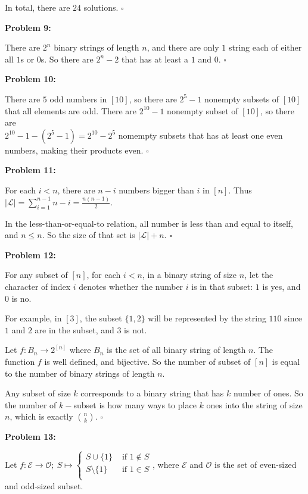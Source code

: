 \documentclass[12pt]{article}
\begin{document}
In total, there are $24$ solutions. $\square$

\textbf{Problem 9:}

There are $2^n$ binary strings of length $n$, and there are only $1$ string each of either all $1$s or $0$s. So there are $2^n-2$ that has at least a $1$ and $0$. $\square$

\textbf{Problem 10:}

There are $5$ odd numbers in $[10]$, so there are $2^5-1$ nonempty subsets of $[10]$ that all elements are odd. There are $2^{10}-1$ nonempty subset of $[10]$, so there are\\ $2^{10}-1-(2^5-1) = 2^{10}-2^5$ nomempty subsets that has at least one even numbers, making their products even. $\square$

\textbf{Problem 11:}

For each $i < n$, there are $n-i$ numbers bigger than $i$ in $[n]$. Thus $|\mathcal{L}| = \sum\limits^{n-1}_{i=1} n-i = \frac{n(n-1)}{2}$.

In the less-than-or-equal-to relation, all number is less than and equal to itself, and $n \le n$. So the size of that set is $|\mathcal{L}| + n$. $\square$

\textbf{Problem 12:}

For any subset of $[n]$, for each $i < n$, in a binary string of size $n$, let the character of index $i$ denotes whether the number $i$ is in that subset: $1$ is yes, and $0$ is no.

For example, in $[3]$, the subset $\{ 1,2 \}$ will be represented by the string $110$ since $1$ and $2$ are in the subset, and $3$ is not.

Let $f: B_n  \to 2^{[n]}$ where $B_n$ is the set of all binary string of length $n$. The function $f$ is well defined, and bijective. So the number of subset of $[n]$ is equal to the number of binary strings of length $n$.

Any subset of size $k$ corresponds to a binary string that has $k$ number of ones. So the number of $k-$subset is how many ways to place $k$ ones into the string of size $n$, which is exactly $\binom{n}{k}$. $\square$

\textbf{Problem 13:}

Let $f: \mathcal{E} \to \mathcal{O}; ~S \mapsto \begin{cases}
    S \cup \{1\}  &\text{ if } 1 \not\in S \\
    S \setminus \{1\} &\text{ if } 1 \in S \\
       \end{cases}$,  where $\mathcal{E}$ and $\mathcal{O}$ is the set of even-sized and odd-sized subset.
\end{document}
